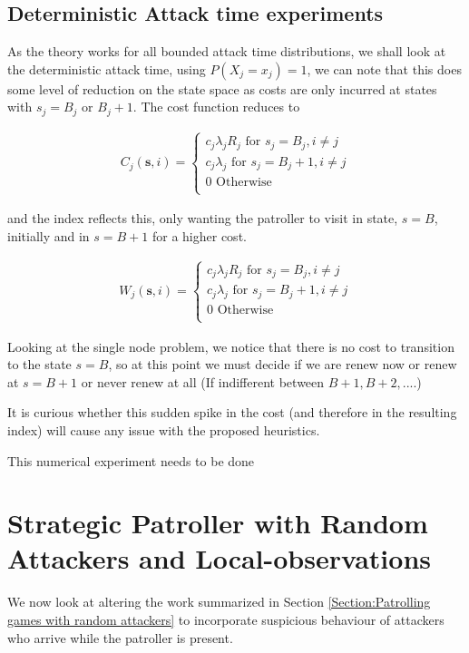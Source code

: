\documentclass[a4paper,10pt]{article}
\theoremstyle{definition}
\theoremstyle{definition}
\theoremstyle{remark}
\theoremstyle{definition}
\begin{document}
\subsection{Deterministic Attack time experiments}
As the theory  works for all bounded attack time distributions, we shall look at the deterministic attack time, using $P(X_{j}=x_{j})=1$, we can note that this does some level of reduction on the state space as costs are only incurred at states with $s_{j}=B_{j}$ or $B_{j}+1$. The cost function reduces to

\begin{align*}
C_{j}(\bm{s},i)=\begin{cases}
c_{j} \lambda_{j} R_{j}  \text{ for } s_{j}=B_{j},i \neq j \\ 
c_{j} \lambda_{j} \text{ for } s_{j}=B_{j}+1,i \neq j  \\
0 \text{ Otherwise} \\
\end{cases}
\end{align*}

and the index reflects this, only wanting the patroller to visit in state, $s=B$, initially and in $s=B+1$ for a higher cost.

\begin{align*}
W_{j}(\bm{s},i)=\begin{cases}
c_{j} \lambda_{j} R_{j}  \text{ for } s_{j}=B_{j},i \neq j \\ 
c_{j} \lambda_{j} \text{ for } s_{j}=B_{j}+1,i \neq j  \\
0 \text{ Otherwise} \\
\end{cases}
\end{align*}

Looking at the single node problem, we notice that there is no cost to transition to the state $s=B$, so at this point we must decide if we are renew now or renew at $s=B+1$ or never renew at all (If indifferent between $B+1,B+2,....$)

It is curious whether this sudden spike in the cost (and therefore in the resulting index) will cause any issue with the proposed heuristics.

\begin{Huge}
This numerical experiment needs to be done
\end{Huge}


\section{Strategic Patroller with Random Attackers and Local-observations}
\label{Section:Patrolling games with random attackers and local-observations}
We now look at altering the work summarized in Section \ref{Section:Patrolling games with random attackers} to incorporate suspicious behaviour of attackers who arrive while the patroller is present.
\end{document}
